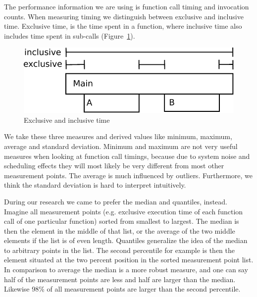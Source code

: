 \documentclass[b5paper, final, hauptseminar]{zih-template}
\begin{document}
The performance information we are using is function call timing and invocation counts.
When measuring timing we distinguish between exclusive and inclusive time.
Exclusive time, is the time spent in a function, where inclusive time also includes time spent in sub-calls (Figure~\ref{fig:id-exclusive-inclusive}).

\begin{figure}[htbp]
	\centering
	\includegraphics[width=0.5\linewidth]{id-exclusive-inclusive}
	\caption{Exclusive and inclusive time}
	\label{fig:id-exclusive-inclusive}
\end{figure}

We take these three measures and derived values like minimum, maximum, average and standard deviation.
Minimum and maximum are not very useful measures when looking at function call timings, because due to system noise and scheduling effects they will most likely be very different from most other measurement points.
The average is much influenced by outliers.
Furthermore, we think the standard deviation is hard to interpret intuitively.

During our research we came to prefer the median and quantiles, instead.
Imagine all measurement points (e.g. exclusive execution time of each function call of one particular function) sorted from smallest to largest.
The median is then the element in the middle of that list, or the average of the two middle elements if the list is of even length.
Quantiles generalize the idea of the median to arbitrary points in the list.
The second percentile for example is then the element situated at the two percent position in the sorted measurement point list.
In comparison to average the median is a more robust measure, and one can say half of the measurement points are less and half are larger than the median. Likewise 98\% of all measurement points are larger than the second percentile.
\end{document}
